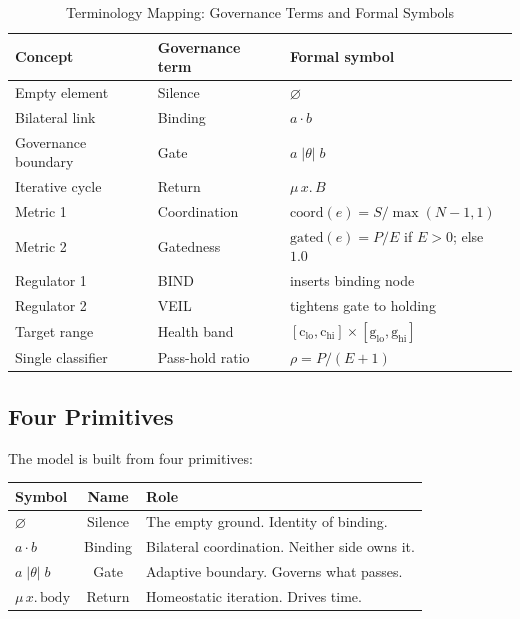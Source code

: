 \documentclass[sigconf,nonacm]{acmart}
\begin{document}
\begin{table}[t]
  \caption{Terminology Mapping: Governance Terms and Formal Symbols}\label{tab:terminology}
  \small
  \begin{tabular}{@{}lll@{}}
    \toprule
    \textbf{Concept} & \textbf{Governance term} & \textbf{Formal symbol} \\
    \midrule
    Empty element      & Silence           & $\varnothing$ \\
    Bilateral link     & Binding           & $a \cdot b$ \\
    Governance boundary& Gate              & $a\;|\theta|\;b$ \\
    Iterative cycle    & Return            & $\mu\, x.\, B$ \\
    Metric 1           & Coordination      & $\mathrm{coord}(e) = S / \max(N{-}1, 1)$ \\
    Metric 2           & Gatedness         & $\mathrm{gated}(e) = P / E$ if $E > 0$; else $1.0$ \\
    Regulator 1        & BIND              & inserts binding node \\
    Regulator 2        & VEIL              & tightens gate to holding \\
    Target range       & Health band       & $[\text{c}_{\text{lo}}, \text{c}_{\text{hi}}] \times [\text{g}_{\text{lo}}, \text{g}_{\text{hi}}]$ \\
    Single classifier  & Pass-hold ratio   & $\rho = P / (E + 1)$ \\
    \bottomrule
  \end{tabular}
\end{table}


\subsection{Four Primitives}\label{sec:primitives}

The model is built from four primitives:

\begin{center}
\small
\begin{tabular}{@{}lcl@{}}
  \toprule
  Symbol & Name & Role \\
  \midrule
  $\varnothing$ & Silence & The empty ground. Identity of binding. \\
  $a \cdot b$ & Binding & Bilateral coordination. Neither side owns it. \\
  $a\;|\theta|\;b$ & Gate & Adaptive boundary. Governs what passes. \\
  $\mu\, x.\, \mathrm{body}$ & Return & Homeostatic iteration. Drives time. \\
  \bottomrule
\end{tabular}
\end{center}
\end{document}
